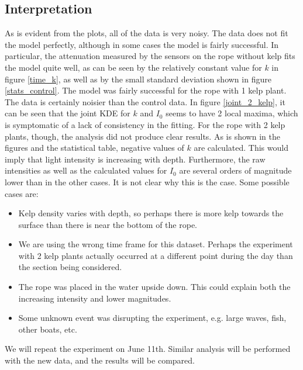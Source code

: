 \subsection{Interpretation}
As is evident from the plots, all of the data is very noisy. The data does not fit the model perfectly, although in some cases the model is fairly successful. In particular, the attenuation measured by the sensors on the rope without kelp fits the model quite well, as can be seen by the relatively constant value for $k$ in figure \ref{time_k}, as well as by the small standard deviation shown in figure \ref{stats_control}. The model was fairly successful for the rope with 1 kelp plant. The data is certainly noisier than the control data. In figure \ref{joint_2_kelp}, it can be seen that the joint KDE for $k$ and $I_0$ seems to have 2 local maxima, which is symptomatic of a lack of consistency in the fitting. For the rope with 2 kelp plants, though, the analysis did not produce clear results. As is shown in the figures and the statistical table, negative values of $k$ are calculated. This would imply that light intensity is increasing with depth. Furthermore, the raw intensities as well as the calculated values for $I_0$ are several orders of magnitude lower than in the other cases. It is not clear why this is the case. Some possible cases are:
\begin{itemize}
	\item Kelp density varies with depth, so perhaps there is more kelp towards the surface than there is near the bottom of the rope.
	\item We are using the wrong time frame for this dataset. Perhaps the experiment with 2 kelp plants actually occurred at a different point during the day than the section being considered.
	\item The rope was placed in the water upside down. This could explain both the increasing intensity and lower magnitudes.
	\item Some unknown event was disrupting the experiment, e.g. large waves, fish, other boats, etc.
\end{itemize}

We will repeat the experiment on June 11th. Similar analysis will be performed with the new data, and the results will be compared.